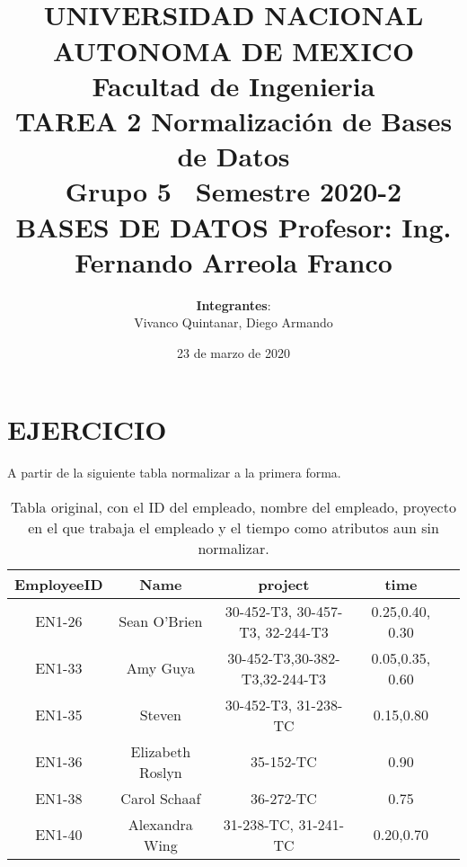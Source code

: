 \documentclass[spanish]{article}
\begin{document}
\title{
\\
UNIVERSIDAD NACIONAL AUTONOMA DE MEXICO\\
\vfill
Facultad de Ingenieria\\
\vfill
{\bfseries TAREA 2}
\vfill
{\bfseries Normalización de Bases de Datos }
\vfill
\\Grupo 5\
\vfill
Semestre 2020-2\\
\vfill
BASES DE DATOS
\vfill
Profesor: Ing. Fernando Arreola Franco}
\vfill
\author{\textbf{Integrantes}:\\
Vivanco Quintanar, Diego Armando\\}
\date{23 de marzo de 2020}
\maketitle
\newpage


\section{EJERCICIO}

    A partir de la siguiente tabla normalizar a la primera forma.
    
     \begin{table}[ht]
    \centering
	\begin{tabular}{|c|c|c| c|l|}
	\hline
	\textbf{EmployeeID} & \textbf{Name} & \textbf{project} &  \textbf{time}\\ \hline
	 EN1-26 & Sean O'Brien & 30-452-T3, 30-457-T3, 32-244-T3 & 0.25,0.40, 0.30\\ \hline
	 EN1-33 & Amy Guya & 30-452-T3,30-382-T3,32-244-T3 & 0.05,0.35, 0.60\\ \hline
	 EN1-35 & Steven  & 30-452-T3, 31-238-TC & 0.15,0.80\\ \hline
	 EN1-36 & Elizabeth Roslyn & 35-152-TC & 0.90\\ \hline
	 EN1-38 & Carol Schaaf & 36-272-TC & 0.75\\ \hline
	 EN1-40 & Alexandra Wing & 31-238-TC, 31-241-TC & 0.20,0.70 \\ \hline
	\end{tabular}
	\caption{Tabla original, con el ID del empleado, nombre del empleado, proyecto en el que trabaja el empleado y el tiempo como atributos aun sin normalizar.} \label{semi}
	\end{table}
	
\end{document}
